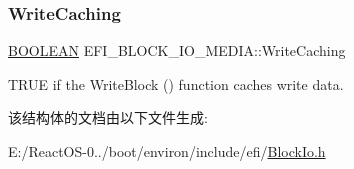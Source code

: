 \subsubsection{\texorpdfstring{Write\+Caching}{WriteCaching}}
{\footnotesize\ttfamily \hyperlink{_processor_bind_8h_a112e3146cb38b6ee95e64d85842e380a}{B\+O\+O\+L\+E\+AN} E\+F\+I\+\_\+\+B\+L\+O\+C\+K\+\_\+\+I\+O\+\_\+\+M\+E\+D\+I\+A\+::\+Write\+Caching}

T\+R\+UE if the Write\+Block () function caches write data. 

该结构体的文档由以下文件生成\+:\begin{DoxyCompactItemize}
\item 
E\+:/\+React\+O\+S-\/0../boot/environ/include/efi/\hyperlink{_block_io_8h}{Block\+Io.\+h}\end{DoxyCompactItemize}

